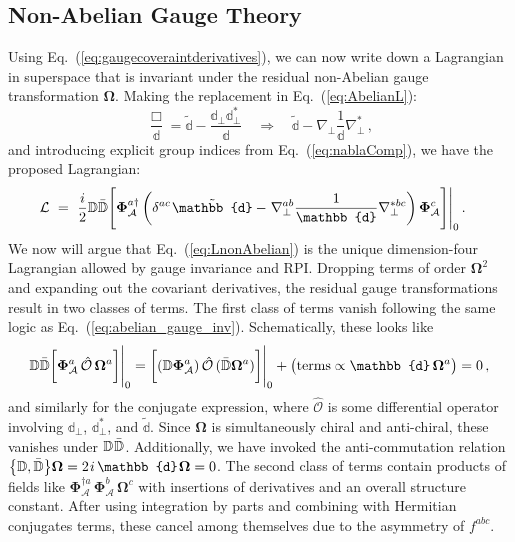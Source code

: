 \documentclass[12pt,document,nofootinbib,superscriptaddress,onecolumn,preprintnumbers,balancelastpage]{article}
\newcommand{\s}{\hspace{0.8pt}}
\newcommand{\PP}{\mathbb{d}}
\DeclareRobustCommand{\Eq}[1]{Eq.~(\ref{#1})}
\newcommand{\D}{\mathbb{D}}
\newcommand{\RCA}{\boldsymbol{\Omega}}
\newcommand{\alc}{\mathcal{A}}
\newcommand{\bPhiA}{\bold \Phi_{\alc}}
\newcommand{\bPhi}{\boldsymbol{\Phi}}
\begin{document}
\begin{spacing}{1.2}
\subsection{Non-Abelian Gauge Theory} 

Using \Eq{eq:gaugecoveraintderivatives}, we can now write down a Lagrangian in superspace that is invariant under the residual non-Abelian gauge transformation $\RCA$.
%
Making the replacement in \Eq{eq:AbelianL}:
%
 \begin{equation}
 \label{eq:covariantBoxReplacement}
\frac{\Box}{\PP} = \tilde{\PP} - \frac{\PP_\perp \PP_\perp^*}{\PP} \quad \Longrightarrow \quad \tilde{\PP} - \nabla_\perp \frac{1}{\PP} \nabla^*_\perp \, ,
\end{equation} 
and introducing explicit group indices from \Eq{eq:nablaComp}, 
%
we have the proposed Lagrangian:   
 \begin{align}
 \label{eq:LnonAbelian}
 \mathcal{L} \,\, &= \,\, \frac{i}{2} \D \bar{\D} \Bigg[ \bPhiA^{a \dagger}  \left( \delta^{ac} \s \tilde{\PP}  - \s \nabla^{ab}_\perp \frac{1}{\PP} \nabla^{*bc}_\perp \right) \bPhiA^c \Bigg] \Bigg|_0  \,.
\end{align} 
%
We now will argue that \Eq{eq:LnonAbelian} is the unique dimension-four Lagrangian allowed by gauge invariance and RPI.
%
Dropping terms of order $\RCA^2$ and expanding out the covariant derivatives, the residual gauge transformations result in two classes of terms.
%
The first class of terms vanish following the same logic as \Eq{eq:abelian_gauge_inv}.
%
Schematically, these looks like
%
\begin{align}
\label{eq:gaugeTransOfTildePPterm}
\D \bar{\D} \bigg[ \bPhiA^{a} \, \hat{\mathcal{O}} \, \RCA^a  \bigg]  \Bigg|_0  =  \bigg[ ( \D \bPhiA^{a}) \, \hat{\mathcal{O}} \, (\bar{\D} \RCA^a)  \bigg]  \Bigg|_0 + \big(\text{terms} \propto \PP  \, \RCA^a \big) = 0 \,,
\end{align}
%
and similarly for the conjugate expression, where $\hat{\mathcal{O}}$ is some differential operator involving $\PP_\perp$, $\PP_\perp^*$, and $\tilde{\PP}$.
%
Since $\RCA$ is simultaneously chiral and anti-chiral, these vanishes under $\D\s \bar{\D}$.
%
Additionally, we have invoked the anti-commutation relation $\big\{\D, \bar{\D} \big\} \RCA= 2\s i\, \PP\s \RCA  = 0$.
%
The second class of terms contain products of fields like $\bPhi_{\alc}^{\dagger a} \, \bPhi_{\alc}^b \, \RCA^c$ with insertions of derivatives and an overall structure constant.
%
After using integration by parts and combining with Hermitian conjugates terms, these cancel among themselves due to the asymmetry of $f^{abc}$. 



\end{spacing}
\end{document}
